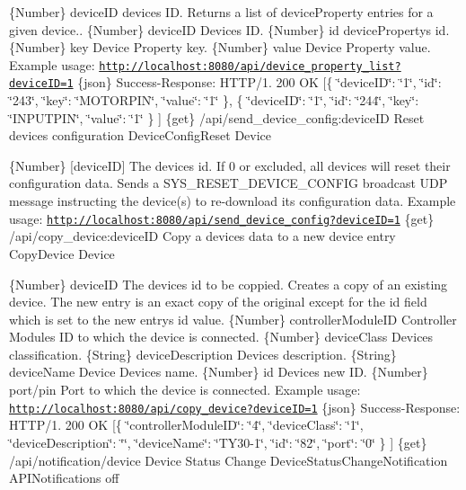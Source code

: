 \{Number\} device\+ID device\textquotesingle{}s ID.  Returns a list of device\+Property entries for a given device..  \{Number\} device\+ID Device\textquotesingle{}s ID.  \{Number\} id device\+Property\textquotesingle{}s id.  \{Number\} key Device Property key.  \{Number\} value Device Property value.  Example usage\+: \href{http://localhost:8080/api/device_property_list?deviceID=1}{\tt http\+://localhost\+:8080/api/device\+\_\+property\+\_\+list?device\+I\+D=1}  \{json\} Success-\/\+Response\+: H\+T\+T\+P/1. 200 OK \mbox{[}\{ \char`\"{}device\+I\+D\char`\"{}\+: \char`\"{}1\char`\"{}, \char`\"{}id\char`\"{}\+: \char`\"{}243\char`\"{}, \char`\"{}key\char`\"{}\+: \char`\"{}\+M\+O\+T\+O\+R\+P\+I\+N\char`\"{}, \char`\"{}value\char`\"{}\+: \char`\"{}1\char`\"{} \}, \{ \char`\"{}device\+I\+D\char`\"{}\+: \char`\"{}1\char`\"{}, \char`\"{}id\char`\"{}\+: \char`\"{}244\char`\"{}, \char`\"{}key\char`\"{}\+: \char`\"{}\+I\+N\+P\+U\+T\+P\+I\+N\char`\"{}, \char`\"{}value\char`\"{}\+: \char`\"{}1\char`\"{} \} \mbox{]}  \{get\} /api/send\+\_\+device\+\_\+config\+:device\+ID Reset device\textquotesingle{}s configuration  Device\+Config\+Reset  Device

\{Number\} \mbox{[}device\+ID\mbox{]} The device\textquotesingle{}s id. If 0 or excluded, all devices will reset their configuration data.  Sends a S\+Y\+S\+\_\+\+R\+E\+S\+E\+T\+\_\+\+D\+E\+V\+I\+C\+E\+\_\+\+C\+O\+N\+F\+IG broadcast U\+DP message instructing the device(s) to re-\/download its configuration data.  Example usage\+: \href{http://localhost:8080/api/send_device_config?deviceID=1}{\tt http\+://localhost\+:8080/api/send\+\_\+device\+\_\+config?device\+I\+D=1}  \{get\} /api/copy\+\_\+device\+:device\+ID Copy a device\textquotesingle{}s data to a new device entry  Copy\+Device  Device

\{Number\} device\+ID The device\textquotesingle{}s id to be coppied.  Creates a copy of an existing device. The new entry is an exact copy of the original except for the id field which is set to the new entry\textquotesingle{}s id value.  \{Number\} controller\+Module\+ID Controller Module\textquotesingle{}s ID to which the device is connected.  \{Number\} device\+Class Device\textquotesingle{}s classification.  \{String\} device\+Description Device\textquotesingle{}s description.  \{String\} device\+Name Device Device\textquotesingle{}s name.  \{Number\} id Device\textquotesingle{}s new ID.  \{Number\} port/pin Port to which the device is connected.  Example usage\+: \href{http://localhost:8080/api/copy_device?deviceID=1}{\tt http\+://localhost\+:8080/api/copy\+\_\+device?device\+I\+D=1}  \{json\} Success-\/\+Response\+: H\+T\+T\+P/1. 200 OK \mbox{[}\{ \char`\"{}controller\+Module\+I\+D\char`\"{}\+: \char`\"{}4\char`\"{}, \char`\"{}device\+Class\char`\"{}\+: \char`\"{}1\char`\"{}, \char`\"{}device\+Description\char`\"{}\+: \char`\"{}\char`\"{}, \char`\"{}device\+Name\char`\"{}\+: \char`\"{}\+T\+Y30-\/1\char`\"{}, \char`\"{}id\char`\"{}\+: \char`\"{}82\char`\"{}, \char`\"{}port\char`\"{}\+: \char`\"{}0\char`\"{} \} \mbox{]}  \{get\} /api/notification/device Device Status Change  Device\+Status\+Change\+Notification  A\+P\+I\+Notifications  off

